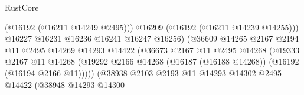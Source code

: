 \begin{lexlean}{RustCore}
\begin{coremodule}
                                                      (@16192 (@16211 @14249 @2495)))
                                                    @16209
                                                    (@16192 (@16211 @14239 @14255)))
                                                  @16227
                                                  @16231
                                                  @16236
                                                  @16241
                                                  @16247
                                                  @16256)
                                                (@36609
                                                  @14265
                                                  @2167
                                                  @2194
                                                  @11
                                                  @2495
                                                  @14269
                                                  @14293
                                                  @14422
                                                  (@36673
                                                    @2167
                                                    @11
                                                    @2495
                                                    @14268
                                                    (@19333
                                                      @2167
                                                      @11
                                                      @14268
                                                      (@19292
                                                        @2166
                                                        @14268
                                                        (@16187 (@16188 @14268))
                                                        (@16192 (@16194 @2166 @11)))))
                                                  (@38938
                                                    @2103
                                                    @2193
                                                    @11
                                                    @14293
                                                    @14302
                                                    @2495
                                                    @14422
                                                    (@38948
                                                      @14293
                                                      @14300

\end{coremodule}
\end{lexlean}
